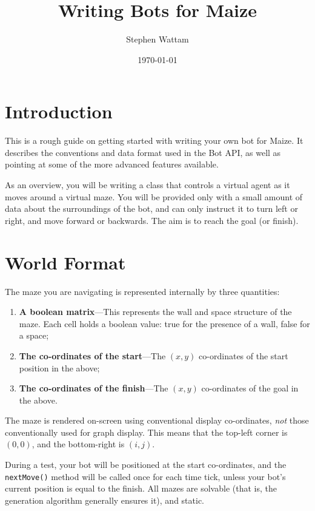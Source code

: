 \documentclass[11pt]{article}
\begin{document}
\title{Writing Bots for Maize}
\author{Stephen Wattam}
\date{\today}
\maketitle

\tableofcontents{}
\pagebreak


\section{Introduction}
This is a rough guide on getting started with writing your own bot for Maize.  It describes the conventions and data format used in the Bot API, as well as pointing at some of the more advanced features available.

As an overview, you will be writing a class that controls a virtual agent as it moves around a virtual maze.  You will be provided only with a small amount of data about the surroundings of the bot, and can only instruct it to turn left or right, and move forward or backwards.  The aim is to reach the goal (or finish).


\section{World Format}
The maze you are navigating is represented internally by three quantities:
\begin{enumerate}
\item \textbf{A boolean matrix}---This represents the wall and space structure of the maze.  Each cell holds a boolean value: true for the presence of a wall, false for a space;
\item \textbf{The co-ordinates of the start}---The $(x,y)$ co-ordinates of the start position in the above;
\item \textbf{The co-ordinates of the finish}---The $(x,y)$ co-ordinates of the goal in the above.
\end{enumerate}
The maze is rendered on-screen using conventional display co-ordinates, \textit{not} those conventionally used for graph display.  This means that the top-left corner is $(0,0)$, and the bottom-right is $(i,j)$.


During a test, your bot will be positioned at the start co-ordinates, and the \texttt{nextMove()} method will be called once for each time tick, unless your bot's current position is equal to the finish.  All mazes are solvable (that is, the generation algorithm generally ensures it), and static.
\end{document}

